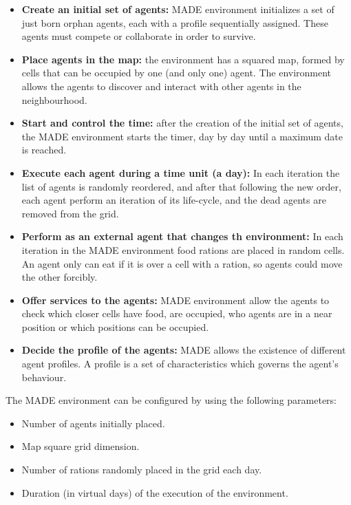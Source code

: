 \documentclass[runningheads]{llncs}
\begin{document}
\begin{itemize}
\item \textbf{Create an initial set of agents:} MADE environment
  initializes a set of just born orphan agents, each with a profile
  sequentially assigned.
 These agents must compete or collaborate in order to survive.
\item \textbf{Place agents in the map:} the environment has a squared map, formed by cells that can be occupied by one (and only one) agent. The environment allows the agents to discover and interact with other agents in the neighbourhood.
\item \textbf{Start and control the time:} after the creation of the initial set of agents, the MADE environment starts the timer, day by day until a maximum date is reached.
\item \textbf{Execute each agent during a time unit (a day):} In each iteration the list of agents is randomly reordered, and after that following the new order, each agent perform an iteration of its life-cycle, and the dead agents are removed from the grid.
\item \textbf{Perform as an external agent that changes th environment:} In each iteration in the MADE environment food rations are placed in random cells. An agent only can eat if it is over a cell with a ration, so agents could move the other forcibly.
\item \textbf{Offer services to the agents:} MADE environment allow the agents to check which closer cells have food, are occupied, who agents are in a near position or which positions can be occupied.
\item \textbf{Decide the profile of the agents:} MADE allows the existence of different agent profiles. A profile is a set of characteristics which governs the agent's behaviour.
\end{itemize}

The MADE environment can be configured by using the following parameters:


\begin{itemize}
\item Number of agents initially placed.
\item Map square grid dimension.
\item Number of rations randomly placed in the grid each day.
\item Duration (in virtual days) of the  execution of the environment.
\end{itemize}
\end{document}
